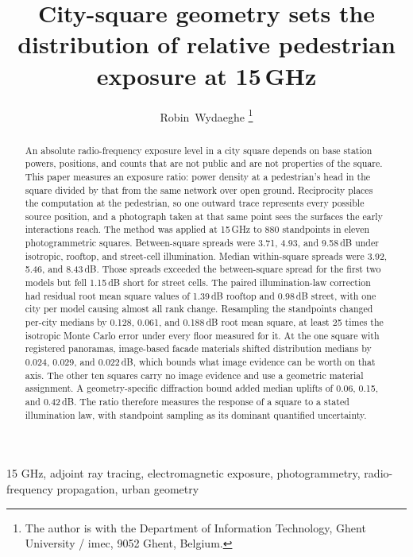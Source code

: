 \documentclass[journal]{IEEEtran}
\begin{document}
\title{City-square geometry sets the distribution of relative pedestrian
exposure at 15\,GHz}
\author{Robin~Wydaeghe%
\thanks{The author is with the Department of Information Technology, Ghent
University / imec, 9052 Ghent, Belgium.}}

\maketitle

\begin{abstract}
An absolute radio-frequency exposure level in a city square depends on base
station powers, positions, and counts that are not public and are not properties
of the square. This paper measures an exposure ratio: power density at a
pedestrian's head in the square divided by that from the same network over open
ground. Reciprocity places the computation at the pedestrian, so one outward
trace represents every possible source position, and a photograph taken at that
same point sees the surfaces the early interactions reach. The method was
applied at 15\,GHz to 880
standpoints in eleven photogrammetric squares. Between-square spreads were
3.71, 4.93, and 9.58\,dB under isotropic, rooftop, and street-cell illumination.
Median within-square spreads were 3.92, 5.46, and 8.43\,dB. Those spreads
exceeded the between-square spread for the first two models but fell 1.15\,dB
short for street cells. The paired illumination-law correction had residual root mean square
values of 1.39\,dB rooftop and 0.98\,dB street, with one city per model causing
almost all rank change. Resampling the standpoints changed per-city medians by
0.128, 0.061, and 0.188\,dB root mean square, at least 25 times the isotropic
Monte Carlo error under every floor measured for it. At the one square with registered panoramas, image-based
facade materials shifted distribution medians by 0.024, 0.029, and 0.022\,dB,
which bounds what image evidence can be worth on that axis. The other ten
squares carry no image evidence and use a geometric material assignment. A
geometry-specific diffraction bound
added median uplifts of 0.06, 0.15, and 0.42\,dB. The ratio therefore measures
the response of a square to a stated illumination law, with standpoint sampling
as its dominant quantified uncertainty.
\end{abstract}

\begin{IEEEkeywords}
15 GHz, adjoint ray tracing, electromagnetic exposure, photogrammetry,
radio-frequency propagation, urban geometry
\end{IEEEkeywords}
\end{document}
